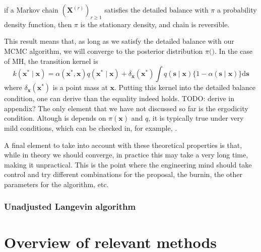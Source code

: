 \documentclass[12pt]{memoir}
\newcommand{\mb}{\mathbf}
\begin{document}
\begin{boxedthm}
    if a Markov chain $(\mb X^{(r)})_{r\geq1}$ satisfies the detailed balance with $\pi$ a probability density function, then $\pi$ is the stationary density, and chain is reversible.
\end{boxedthm}

This result means that, as long as we satisfy the detailed balance with our MCMC algorithm, we will converge to the posterior distribution $\pi(\mb)$. In the case of MH, the transition kernel is 
\begin{equation}
    k\left(\boldsymbol{x}^* \mid \boldsymbol{x}\right)=\alpha\left(\boldsymbol{x}^*, \boldsymbol{x}\right) q\left(\boldsymbol{x}^* \mid \boldsymbol{x}\right)+\delta_{\boldsymbol{x}}\left(\boldsymbol{x}^*\right) \int q(\boldsymbol{s} \mid \boldsymbol{x})\{1-\alpha(\boldsymbol{s} \mid \boldsymbol{x})\} \mathrm{d} \boldsymbol{s}
\end{equation}
where $\delta_{\mb x}(\mb x^*)$ is a point mass at $\mb x$. Putting this kernel into the detailed balance condition, one can derive than the equality indeed holds. TODO: derive in appendix? The only element that we have not discussed so far is the ergodicity condition. Altough is depends on $\pi(\mb x)$ and $q$, it is typically true under very mild conditions, which can be checked in, for example, \cite{mcmc:RobertCasella2004}.\medbreak

A final element to take into account with these theoretical properties is that, while in theory we should converge, in practice this may take a very long time, making it unpractical. This is the point where the engineering mind should take control and try different combinations for the proposal, the burnin, the other parameters for the algorithm, etc.


\subsection{Unadjusted Langevin algorithm}



\chapter{Overview of relevant methods} \label{section:relevant-methods}
\end{document}
